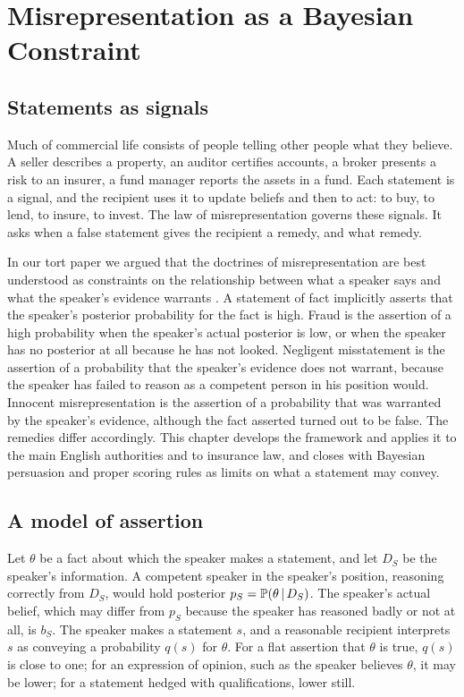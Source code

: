 \chapter{Misrepresentation as a Bayesian Constraint}
\label{ch:misrep}

\section{Statements as signals}

Much of commercial life consists of people telling other people what they believe. A seller describes a property, an auditor certifies accounts, a broker presents a risk to an insurer, a fund manager reports the assets in a fund. Each statement is a signal, and the recipient uses it to update beliefs and then to act: to buy, to lend, to insure, to invest. The law of misrepresentation governs these signals. It asks when a false statement gives the recipient a remedy, and what remedy.

In our tort paper we argued that the doctrines of misrepresentation are best understood as constraints on the relationship between what a speaker says and what the speaker's evidence warrants \citep{polson_sokolov_tort}. A statement of fact implicitly asserts that the speaker's posterior probability for the fact is high. Fraud is the assertion of a high probability when the speaker's actual posterior is low, or when the speaker has no posterior at all because he has not looked. Negligent misstatement is the assertion of a probability that the speaker's evidence does not warrant, because the speaker has failed to reason as a competent person in his position would. Innocent misrepresentation is the assertion of a probability that was warranted by the speaker's evidence, although the fact asserted turned out to be false. The remedies differ accordingly. This chapter develops the framework and applies it to the main English authorities and to insurance law, and closes with Bayesian persuasion and proper scoring rules as limits on what a statement may convey.

\section{A model of assertion}

Let $\theta$ be a fact about which the speaker makes a statement, and let $D_S$ be the speaker's information. A competent speaker in the speaker's position, reasoning correctly from $D_S$, would hold posterior $p_S = \mathbb{P}(\theta \,\vert\, D_S)$. The speaker's actual belief, which may differ from $p_S$ because the speaker has reasoned badly or not at all, is $b_S$. The speaker makes a statement $s$, and a reasonable recipient interprets $s$ as conveying a probability $q(s)$ for $\theta$. For a flat assertion that $\theta$ is true, $q(s)$ is close to one; for an expression of opinion, such as the speaker believes $\theta$, it may be lower; for a statement hedged with qualifications, lower still.

